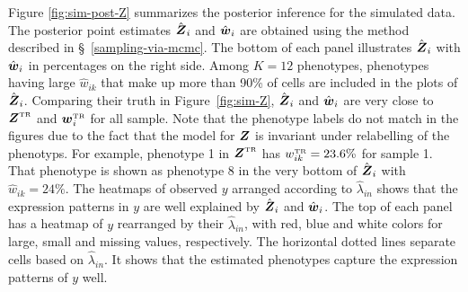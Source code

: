 \documentclass[12pt,]{article}
\def\Z{\bm{Z}}
\newcommand{\true}{{\mbox{\tiny TR}}}
\newcommand{\bZ}{\mbox{\boldmath $Z$}}
\newcommand{\bw}{\mbox{\boldmath $w$}}
\begin{document}
Figure \ref{fig:sim-post-Z} summarizes the posterior inference for the
simulated data.  The posterior point estimates $\hat{\bZ}_i$ and $\hat{\bw}_i$
are obtained using the method described in \S~\ref{sampling-via-mcmc}.  
%
The bottom of each panel illustrates $\hat{\bZ}_i$ with $\hat{\bw}_i$ in
percentages on the right side. Among $K=12$ phenotypes, phenotypes having large
$\hat{w}_{ik}$ that make up more than 90\% of cells are included in the plots
of $\hat{\bZ}_i$. Comparing their truth in Figure~\ref{fig:sim-Z},
$\hat{\bZ}_i$ and $\hat{\bw}_i$ are very close to $\bZ^\true$ and $\bw_i^\true$
for all sample. Note that the phenotype labels do not match in the figures due
to the fact that the model for $\bZ$ is invariant under relabelling of the
phenotyps. For example, phenotype 1 in $\bZ^\true$ has $w^\true_{ik}=23.6\%$
for sample 1.  That phenotype is shown as phenotype 8 in the very bottom of
$\hat{\bZ}_i$ with $\hat{w}_{ik}=24\%$.
The heatmaps of observed $y$ arranged according to $\hat{\lambda}_{in}$ shows
that the expression patterns in $y$ are well explained by $\hat{\bZ}_i$ and
$\hat{\bw}_i$.  The top of each panel has a heatmap of $y$ rearranged by their
$\hat{\lambda}_{in}$, with red, blue and white colors for large, small and
missing values, respectively.  The horizontal dotted lines separate cells based
on $\hat{\lambda}_{in}$.  It shows that the estimated phenotypes capture the
expression patterns of $y$ well.    
\end{document}
